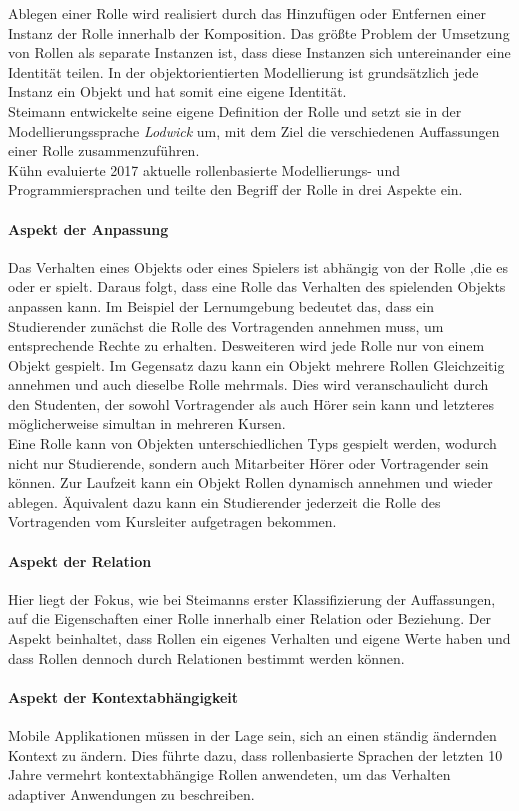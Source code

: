 \documentclass[conference]{IEEEtran}
\begin{document}
Ablegen einer Rolle wird realisiert durch das Hinzufügen oder Entfernen einer Instanz der Rolle innerhalb der Komposition. Das größte Problem der Umsetzung von Rollen als separate Instanzen ist, dass diese Instanzen sich untereinander eine Identität teilen. In der objektorientierten Modellierung ist grundsätzlich jede Instanz ein Objekt und hat somit eine eigene Identität. \\ Steimann entwickelte seine eigene Definition der Rolle und setzt sie in der Modellierungssprache \textit{Lodwick} um, mit dem Ziel die verschiedenen Auffassungen einer Rolle zusammenzuführen. \\Kühn evaluierte 2017 aktuelle rollenbasierte Modellierungs- und Programmiersprachen und teilte den Begriff der Rolle in drei Aspekte ein\cite{family}. \paragraph{Aspekt der Anpassung} Das Verhalten eines Objekts oder eines Spielers ist abhängig von der Rolle ,die es oder er spielt. Daraus folgt, dass eine Rolle das Verhalten des spielenden Objekts anpassen kann. Im Beispiel der Lernumgebung bedeutet das, dass ein Studierender zunächst die Rolle des Vortragenden annehmen muss, um entsprechende Rechte zu erhalten. Desweiteren wird jede Rolle nur von einem Objekt gespielt. Im Gegensatz dazu kann ein Objekt mehrere Rollen Gleichzeitig annehmen und auch dieselbe Rolle mehrmals. Dies wird veranschaulicht durch den Studenten, der sowohl Vortragender als auch Hörer sein kann und letzteres möglicherweise simultan in mehreren Kursen.\\ Eine Rolle kann von Objekten unterschiedlichen Typs gespielt werden, wodurch nicht nur Studierende, sondern auch Mitarbeiter Hörer oder Vortragender sein können. Zur Laufzeit kann ein Objekt Rollen dynamisch annehmen und wieder ablegen. Äquivalent dazu kann ein Studierender jederzeit die Rolle des Vortragenden vom Kursleiter aufgetragen bekommen.\\ \paragraph{Aspekt der Relation} Hier liegt der Fokus, wie bei Steimanns erster Klassifizierung der Auffassungen, auf die Eigenschaften einer Rolle innerhalb einer Relation oder Beziehung. Der Aspekt beinhaltet, dass Rollen ein eigenes Verhalten und eigene Werte haben und dass Rollen dennoch durch Relationen bestimmt werden können.  \paragraph{Aspekt der Kontextabhängigkeit} Mobile Applikationen müssen in der Lage sein, sich an einen ständig ändernden Kontext zu ändern. Dies führte dazu, dass rollenbasierte Sprachen der letzten 10 Jahre vermehrt kontextabhängige Rollen anwendeten, um das Verhalten adaptiver Anwendungen zu beschreiben.
\end{document}

